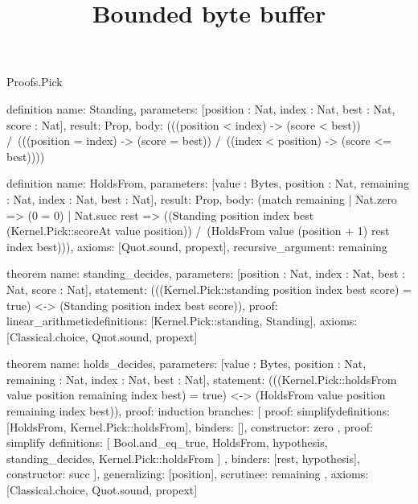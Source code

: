 \begin{lexlean}{Proofs.Pick}
\title{Bounded byte buffer}
\begin{semanticmodule}
definition{
  name: Standing,
  parameters: [position : Nat, index : Nat, best : Nat, score : Nat],
  result: Prop,
  body: (((position < index) -> (score < best)) /\ (((position = index) -> (score = best)) /\ ((index < position) -> (score <= best))))
}

definition{
  name: HoldsFrom,
  parameters: [value : Bytes, position : Nat, remaining : Nat, index : Nat, best : Nat],
  result: Prop,
  body: (match remaining
    | Nat.zero => (0 = 0)
    | Nat.succ rest => ((Standing position index best (Kernel.Pick::scoreAt value position)) /\ (HoldsFrom value (position + 1) rest index best))),
  axioms: [Quot.sound, propext],
  recursive_argument: remaining
}

theorem{
  name: standing_decides,
  parameters: [position : Nat, index : Nat, best : Nat, score : Nat],
  statement: (((Kernel.Pick::standing position index best score) = true) <-> (Standing position index best score)),
  proof: linear_arithmetic{definitions: [Kernel.Pick::standing, Standing]},
  axioms: [Classical.choice, Quot.sound, propext]
}

theorem{
  name: holds_decides,
  parameters: [value : Bytes, position : Nat, remaining : Nat, index : Nat, best : Nat],
  statement: (((Kernel.Pick::holdsFrom value position remaining index best) = true) <-> (HoldsFrom value position remaining index best)),
  proof: induction{
    branches: [
      {
        proof: simplify{definitions: [HoldsFrom, Kernel.Pick::holdsFrom]},
        binders: [],
        constructor: zero
      },
      {
        proof: simplify{
          definitions: [
            Bool.and_eq_true,
            HoldsFrom,
            hypothesis,
            standing_decides,
            Kernel.Pick::holdsFrom
          ]
        },
        binders: [rest, hypothesis],
        constructor: succ
      }
    ],
    generalizing: [position],
    scrutinee: remaining
  },
  axioms: [Classical.choice, Quot.sound, propext]
}
\end{semanticmodule}
\end{lexlean}
